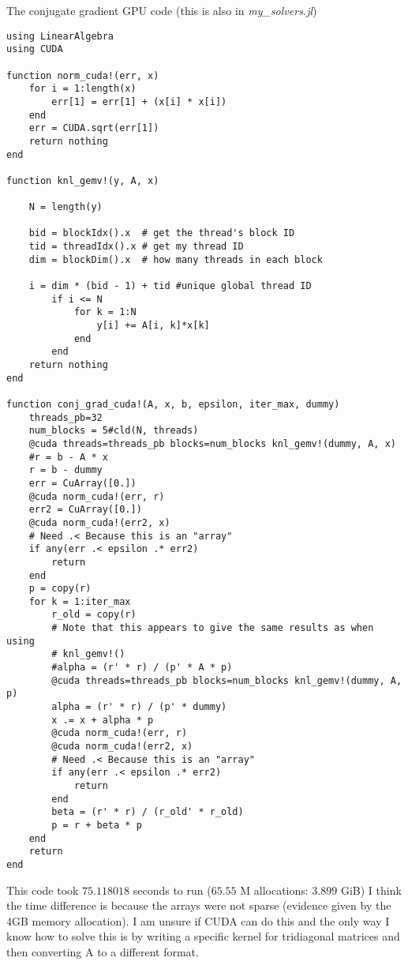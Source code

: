 \documentclass{article}
\begin{document}
The conjugate gradient GPU code (this is also in \textit{my\_solvers.jl})
\begin{lstlisting}
using LinearAlgebra
using CUDA

function norm_cuda!(err, x)
    for i = 1:length(x)
        err[1] = err[1] + (x[i] * x[i])
    end
    err = CUDA.sqrt(err[1])
    return nothing
end

function knl_gemv!(y, A, x)

    N = length(y)

    bid = blockIdx().x  # get the thread's block ID
    tid = threadIdx().x # get my thread ID
    dim = blockDim().x  # how many threads in each block

    i = dim * (bid - 1) + tid #unique global thread ID
        if i <= N
            for k = 1:N
                y[i] += A[i, k]*x[k]
            end
        end
    return nothing
end

function conj_grad_cuda!(A, x, b, epsilon, iter_max, dummy)
    threads_pb=32
    num_blocks = 5#cld(N, threads)
    @cuda threads=threads_pb blocks=num_blocks knl_gemv!(dummy, A, x)
    #r = b - A * x
    r = b - dummy
    err = CuArray([0.])
    @cuda norm_cuda!(err, r)
    err2 = CuArray([0.])
    @cuda norm_cuda!(err2, x)
    # Need .< Because this is an "array"
    if any(err .< epsilon .* err2)
        return 
    end
    p = copy(r)
    for k = 1:iter_max
        r_old = copy(r)
        # Note that this appears to give the same results as when using
        # knl_gemv!()
        #alpha = (r' * r) / (p' * A * p)
        @cuda threads=threads_pb blocks=num_blocks knl_gemv!(dummy, A, p)
        alpha = (r' * r) / (p' * dummy)
        x .= x + alpha * p
        @cuda norm_cuda!(err, r)
        @cuda norm_cuda!(err2, x)
        # Need .< Because this is an "array"
        if any(err .< epsilon .* err2)
            return 
        end
        beta = (r' * r) / (r_old' * r_old)
        p = r + beta * p
    end
    return 
end
\end{lstlisting}

This code took $75.118018$ seconds to run ($65.55$ M allocations: $3.899$ GiB) I
think the time difference is because the arrays were not sparse (evidence given
by the 4GB memory allocation). I am unsure if CUDA can do this and the only way
I know how to solve this is by writing a specific kernel for tridiagonal
matrices and then converting A to a different format. 
\end{document}
